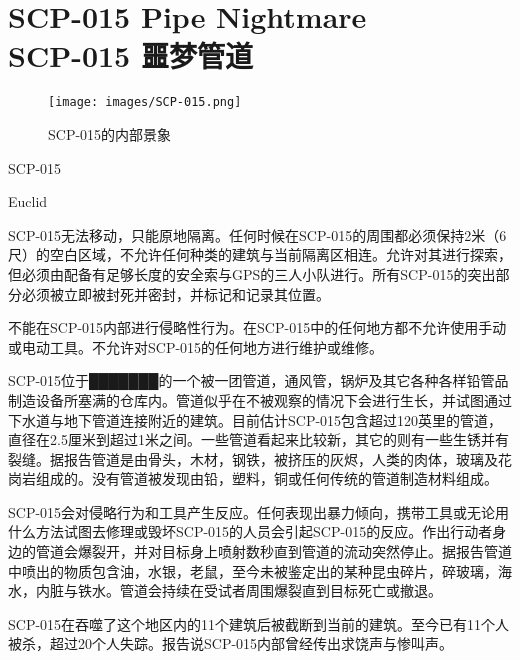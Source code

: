 \chapter[SCP-015 噩梦管道]{
    SCP-015 Pipe Nightmare\\
    SCP-015 噩梦管道
}

\label{chap:SCP-015}

\begin{figure}[H]
    \centering
    \texttt{[image: images/SCP-015.png]}
    \caption*{SCP-015的内部景象}
\end{figure}

SCP-015

Euclid

SCP-015无法移动，只能原地隔离。任何时候在SCP-015的周围都必须保持2米（6尺）的空白区域，不允许任何种类的建筑与当前隔离区相连。允许对其进行探索，但必须由配备有足够长度的安全索与GPS的三人小队进行。所有SCP-015的突出部分必须被立即被封死并密封，并标记和记录其位置。

不能在SCP-015内部进行侵略性行为。在SCP-015中的任何地方都不允许使用手动或电动工具。不允许对SCP-015的任何地方进行维护或维修。

SCP-015位于███████的一个被一团管道，通风管，锅炉及其它各种各样铅管品制造设备所塞满的仓库内。管道似乎在不被观察的情况下会进行生长，并试图通过下水道与地下管道连接附近的建筑。目前估计SCP-015包含超过120英里的管道，直径在2.5厘米到超过1米之间。一些管道看起来比较新，其它的则有一些生锈并有裂缝。据报告管道是由骨头，木材，钢铁，被挤压的灰烬，人类的肉体，玻璃及花岗岩组成的。没有管道被发现由铅，塑料，铜或任何传统的管道制造材料组成。

SCP-015会对侵略行为和工具产生反应。任何表现出暴力倾向，携带工具或无论用什么方法试图去修理或毁坏SCP-015的人员会引起SCP-015的反应。作出行动者身边的管道会爆裂开，并对目标身上喷射数秒直到管道的流动突然停止。据报告管道中喷出的物质包含油，水银，老鼠，至今未被鉴定出的某种昆虫碎片，碎玻璃，海水，内脏与铁水。管道会持续在受试者周围爆裂直到目标死亡或撤退。

SCP-015在吞噬了这个地区内的11个建筑后被截断到当前的建筑。至今已有11个人被杀，超过20个人失踪。报告说SCP-015内部曾经传出求饶声与惨叫声。
